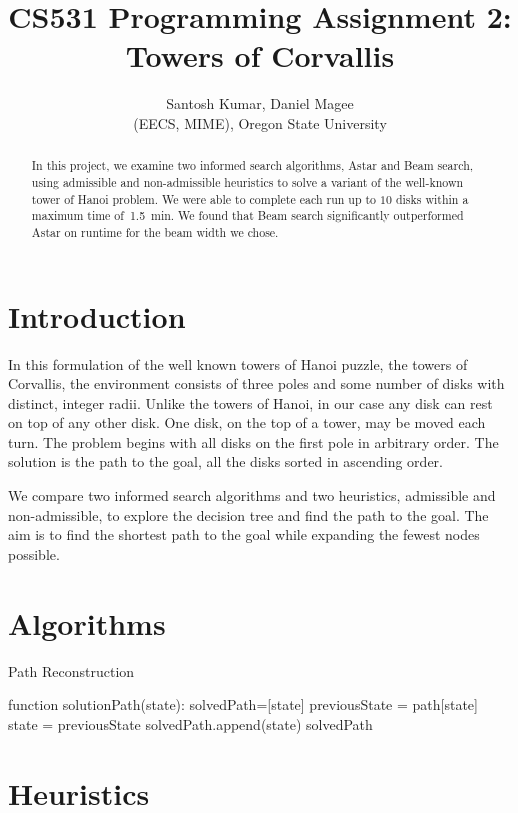 \documentclass[12pt]{article}
\title{CS531 Programming Assignment 2: Towers of Corvallis}
\author{
        Santosh Kumar, Daniel Magee \\
        (EECS, MIME), Oregon State University\\
}
\begin{document}
\maketitle

\begin{abstract}
In this project, we examine two informed search algorithms, Astar and Beam search, using admissible and non-admissible heuristics to solve a variant of the well-known tower of Hanoi problem. 
We were able to complete each run up to $10$ disks within a maximum time of~\SI{1.5}{min}.
We found that Beam search significantly outperformed Astar on runtime for the beam width we chose.
\end{abstract}
    
\section{Introduction}
In this formulation of the well known towers of Hanoi puzzle, the towers of Corvallis, the environment consists of three poles and some number of disks with distinct, integer radii.
Unlike the towers of Hanoi, in our case any disk can rest on top of any other disk. 
One disk, on the top of a tower, may be moved each turn.
The problem begins with all disks on the first pole in arbitrary order.
The solution is the path to the goal, all the disks sorted in ascending order.

We compare two informed search algorithms and two heuristics, admissible and non-admissible, to explore the decision tree and find the path to the goal.
The aim is to find the shortest path to the goal while expanding the fewest nodes possible.

\section{Algorithms}
\begin{algorithm}[!h]
\caption{Path Reconstruction}
\label{alg:reconstructpath}
\begin{algorithmic}
\STATE function solutionPath(state):
\STATE solvedPath=[state]
	\STATE previousState = path[state]
	\STATE state = previousState
	\STATE solvedPath.append(state)
\ENDWHILE
\RETURN solvedPath
\end{algorithmic}
\end{algorithm}





\section{Heuristics}
\end{document}
